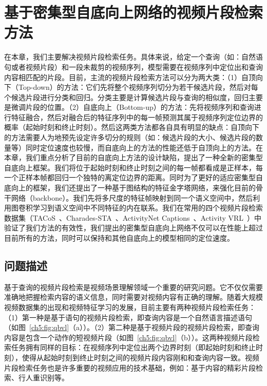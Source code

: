 \chapter{基于密集型自底向上网络的视频片段检索方法}

在本章，我们主要解决视频片段检索任务。具体来说，给定一个查询（如：自然语句或者视频片段）和一段未裁剪的视频序列，模型需要在视频序列中定位出和查询内容相匹配的片段。目前，主流的视频片段检索方法可以分为两大类：（1）自顶向下（Top-down）的方法：它们先将整个视频序列切分为若干候选片段，然后对每个候选片段进行分类和回归。分类主要是计算候选片段与查询的相似度，回归主要是微调片段的位置。（2）自底向上（Bottom-up）的方法：先将视频序列和查询进行特征融合，然后对融合后的特征序列中的每一帧预测其属于视频序列定位边界的概率（起始时刻和终止时刻）。然后这两类方法都各自具有明显的缺点：自顶向下的方法需要人为地预先设定许多切分的规则（如：候选片段的大小、候选片段的数量等）同时定位速度也较慢，而自底向上的方法的性能还低于自顶向上的方法。在本章，我们重点分析了目前的自底向上方法的设计缺陷，提出了一种全新的密集型自底向上框架。我们将位于起始时刻和终止时刻之间的每一帧都看成是正样本，每一个正样本帧都回归一个独特的离定位边界的距离。同时为了更好的适应密集型自底向上的框架，我们还提出了一种基于图结构的特征金字塔网络，来强化目前的骨干网络（backbone）。我们先将多尺度的特征帧映射到同一个语义空间中，然后利用图卷积学习到语义空间中不同特征的内在联系。我们在常用的四个视频片段检索数据集（TACoS~\cite{regneri2013grounding}、Charades-STA~\cite{gao2017tall}、ActivityNet Captions~\cite{krishna2017dense}、Activity VRL~\cite{feng2018video}）中验证了我们方法的有效性，我们提出的密集型自底向上网络不仅可以在性能上超过目前所有的方法，同时可以保持和其他自底向上的模型相同的定位速度。


\section{问题描述}

基于查询的视频片段检索是视频场景理解领域一个重要的研究问题。它不仅仅需要准确地把握检索内容的语义信息，同时需要对视频内容有正确的理解。随着大规模视频数据集的出现和视频特征学习的发展，目前主要有两种视频片段检索任务：（1）第一种是基于语句的视频片段检索，即查询内容是一个自然语言描述语句（如图~\ref{ch5:fig:qbvl}（a））。（2）第二种是基于视频片段的视频片段检索，即查询内容是包含一个动作的短视频片段（如图~\ref{ch5:fig:qbvl}（b））。这两种视频片段检索任务拥有同样的目标：在视频序列中定位出两个边界时刻（即起始时刻和终止时刻），使得从起始时刻到终止时刻之间的视频片段内容刚和和查询内容一致。视频片段检索任务也是许多重要的视频应用的技术基础，例如：基于内容的精彩片段检索、行人重识别等。

